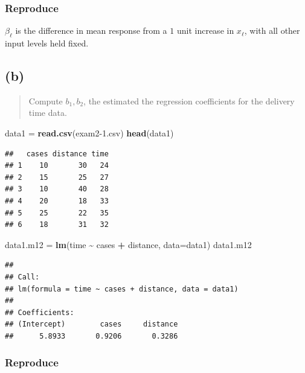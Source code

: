 \documentclass[
]{article}
\newenvironment{Shaded}{\begin{snugshade}}{\end{snugshade}}
\newcommand{\AttributeTok}[1]{\textcolor[rgb]{0.13,0.29,0.53}{#1}}
\newcommand{\FunctionTok}[1]{\textcolor[rgb]{0.13,0.29,0.53}{\textbf{#1}}}
\newcommand{\NormalTok}[1]{#1}
\newcommand{\OtherTok}[1]{\textcolor[rgb]{0.56,0.35,0.01}{#1}}
\newcommand{\SpecialCharTok}[1]{\textcolor[rgb]{0.81,0.36,0.00}{\textbf{#1}}}
\newcommand{\StringTok}[1]{\textcolor[rgb]{0.31,0.60,0.02}{#1}}
\begin{document}
\hypertarget{reproduce}{%
\subsubsection{Reproduce}\label{reproduce}}

\(\beta_\ell\) is the difference in mean response from a \(1\) unit
increase in \(x_\ell\), with all other input levels held fixed.

\hypertarget{b}{%
\subsection{(b)}\label{b}}

\begin{quote}
Compute \(b_1,b_2\), the estimated the regression coefficients for the
delivery time data.
\end{quote}

\begin{Shaded}
\begin{Highlighting}[]
\NormalTok{data1 }\OtherTok{=} \FunctionTok{read.csv}\NormalTok{(}\StringTok{\textquotesingle{}exam2{-}1.csv\textquotesingle{}}\NormalTok{)}
\FunctionTok{head}\NormalTok{(data1)}
\end{Highlighting}
\end{Shaded}

\begin{verbatim}
##   cases distance time
## 1    10       30   24
## 2    15       25   27
## 3    10       40   28
## 4    20       18   33
## 5    25       22   35
## 6    18       31   32
\end{verbatim}

\begin{Shaded}
\begin{Highlighting}[]
\NormalTok{data1.m12 }\OtherTok{=} \FunctionTok{lm}\NormalTok{(time }\SpecialCharTok{\textasciitilde{}}\NormalTok{ cases }\SpecialCharTok{+}\NormalTok{ distance, }\AttributeTok{data=}\NormalTok{data1)}
\NormalTok{data1.m12}
\end{Highlighting}
\end{Shaded}

\begin{verbatim}
## 
## Call:
## lm(formula = time ~ cases + distance, data = data1)
## 
## Coefficients:
## (Intercept)        cases     distance  
##      5.8933       0.9206       0.3286
\end{verbatim}

\hypertarget{reproduce-1}{%
\subsubsection{Reproduce}\label{reproduce-1}}
\end{document}
